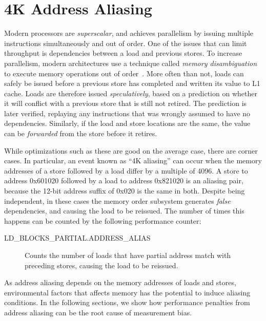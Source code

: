 \documentclass[prodmode,acmtaco]{acmsmall}
\begin{document}
\section{4K Address Aliasing}
\label{sec:aliasing}
Modern processors are \emph{superscalar}, and achieves parallelism by issuing multiple instructions simultaneously and out of order.
One of the issues that can limit throughput is dependencies between a load and previous stores.
To increase parallelism, modern architectures use a technique called \emph{memory disambiguation} to execute memory operations out of order~\cite{Intel:2006:InsideICM:SmartMemoryAccess}. 
More often than not, loads can safely be issued before a previous store has completed and written its value to L1 cache.
Loads are therefore issued \emph{speculatively}, based on a prediction on whether it will conflict with a previous store that is still not retired.
The prediction is later verified, replaying any instructions that was wrongly assumed to have no dependencies.
Similarly, if the load and store locations are the same, the value can be \emph{forwarded} from the store before it retires.

While optimizations such as these are good on the average case, there are corner cases. 
In particular, an event known as ``4K aliasing'' can occur when the memory addresses of a store followed by a load differ by a multiple of 4096.
A store to address 0x601020 followed by a load to address 0x821020 is an aliasing pair, because the 12-bit address suffix of 0x020 is the same in both. 
Despite being independent, in these cases the memory order subsystem generates \emph{false} dependencies, and causing the load to be reissued.
The number of times this happens can be counted by the following performance counter:
\begin{description}
  \item[LD\_BLOCKS\_PARTIAL.ADDRESS\_ALIAS]
  Counts the number of loads that have partial address match with preceding stores, causing the load to be reissued.~\cite{OptimizationManual} %
\end{description}

As address aliasing depends on the memory addresses of loads and stores, environmental factors that affects memory has the potential to induce aliasing conditions.
In the following sections, we show how performance penalties from address aliasing can be the root cause of measurement bias.
\end{document}

